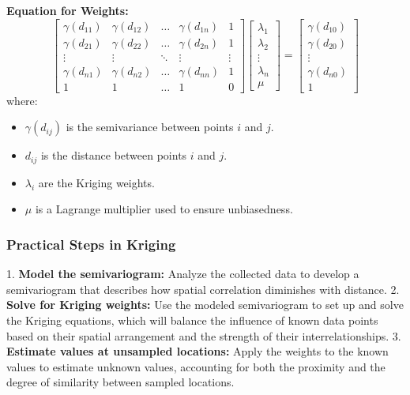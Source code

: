\documentclass{article}
\begin{document}
\textbf{Equation for Weights:}
\[
\begin{bmatrix}
\gamma(d_{11}) & \gamma(d_{12}) & \dots & \gamma(d_{1n}) & 1 \\
\gamma(d_{21}) & \gamma(d_{22}) & \dots & \gamma(d_{2n}) & 1 \\
\vdots & \vdots & \ddots & \vdots & \vdots \\
\gamma(d_{n1}) & \gamma(d_{n2}) & \dots & \gamma(d_{nn}) & 1 \\
1 & 1 & \dots & 1 & 0
\end{bmatrix}
\begin{bmatrix}
\lambda_1 \\
\lambda_2 \\
\vdots \\
\lambda_n \\
\mu
\end{bmatrix}
=
\begin{bmatrix}
\gamma(d_{10}) \\
\gamma(d_{20}) \\
\vdots \\
\gamma(d_{n0}) \\
1
\end{bmatrix}
\]
where:
\begin{itemize}
    \item $\gamma(d_{ij})$ is the semivariance between points $i$ and $j$.
    \item $d_{ij}$ is the distance between points $i$ and $j$.
    \item $\lambda_i$ are the Kriging weights.
    \item $\mu$ is a Lagrange multiplier used to ensure unbiasedness.
\end{itemize}

\subsubsection{Practical Steps in Kriging}
1. \textbf{Model the semivariogram:} Analyze the collected data to develop a semivariogram that describes how spatial correlation diminishes with distance.
2. \textbf{Solve for Kriging weights:} Use the modeled semivariogram to set up and solve the Kriging equations, which will balance the influence of known data points based on their spatial arrangement and the strength of their interrelationships.
3. \textbf{Estimate values at unsampled locations:} Apply the weights to the known values to estimate unknown values, accounting for both the proximity and the degree of similarity between sampled locations.
\end{document}
